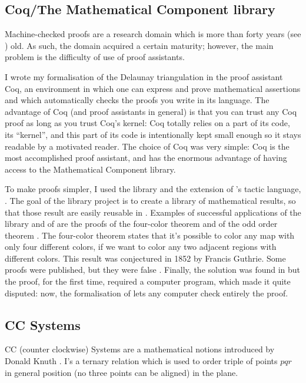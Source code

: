 \documentclass[a4paper,10pt]{article}
\begin{document}
\subsection{Coq/The Mathematical Component library}

Machine-checked proofs are a research domain which is more than forty years (see \cite{Automath}) old. As such, the domain acquired a certain maturity; however, the main problem is the difficulty of use of proof assistants.

I wrote my formalisation of the Delaunay triangulation in the proof assistant {\sc Coq}, an environment in which one can express and prove mathematical assertions and which automatically checks the proofs you write in its language. The advantage of {\sc Coq} (and proof assistants in general) is that you can trust any {\sc Coq} proof as long as you trust {\sc Coq}'s kernel: {\sc Coq} totally relies on a part of its code, its ``kernel'', and this part of its code is intentionally kept small enough so it stays readable by a motivated reader. The choice of {\sc Coq} was very simple: {\sc Coq} is the most accomplished proof assistant, and has the enormous advantage of having access to the {\sc Mathematical Component} library.

To make proofs simpler, I used the {} library and the extension of {}'s tactic language, {}. The goal of the {} library project is to create a library of mathematical results, so that those result are easily reusable in {}. Examples of successful applications of the {} library and of {} are the proofs of the four-color theorem \cite{Gonthier08} and of the odd order theorem \cite{odd}. The four-color theorem states that it's possible to color any map with only four different colors, if we want to color any two adjacent regions with different colors. This result was conjectured in 1852 by Francis Guthrie. Some proofs were published, but they were false \cite{falseproof}. Finally, the solution was found in \cite{proof4} but the proof, for the first time, required a computer program, which made it quite disputed: now, the formalisation of \cite{Gonthier08} lets any computer check entirely the proof.

\subsection{CC Systems}
\label{CC}
CC (counter clockwise) Systems are a mathematical notions introduced by Donald Knuth \cite{Knuth92}. I's a ternary relation which is used to order triple of points $pqr$ in general position (no three points can be aligned) in the plane.
\end{document}
